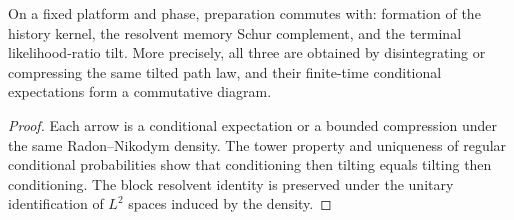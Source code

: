 \begin{proposition}
\label{prop:rr2-c2-memory}
On a fixed platform and phase, preparation commutes with: formation of the
history kernel, the resolvent memory Schur complement, and the terminal
likelihood-ratio tilt.  More precisely, all three are obtained by
disintegrating or compressing the same tilted path law, and their finite-time
conditional expectations form a commutative diagram.
\end{proposition}

\begin{proof}
Each arrow is a conditional expectation or a bounded compression under the
same Radon--Nikodym density.  The tower property and uniqueness of regular
conditional probabilities show that conditioning then tilting equals
tilting then conditioning.  The block resolvent identity is preserved under
the unitary identification of \(L^2\) spaces induced by the density.
\end{proof}
